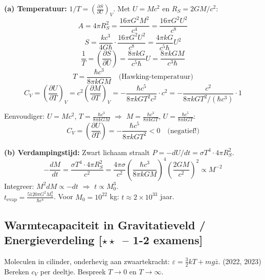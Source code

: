 \documentclass[10pt,a4paper]{article}
\newcommand{\pder}[2]{\left(\frac{\partial #1}{\partial #2}\right)}
\begin{document}
\begin{oplossing}
\textbf{(a) Temperatuur:} $1/T = \pder{S}{U}_V$. Met $U = Mc^2$ en $R_S = 2GM/c^2$:
$$A = 4\pi R_S^2 = \frac{16\pi G^2 M^2}{c^4} = \frac{16\pi G^2 U^2}{c^8}$$
$$S = \frac{kc^3}{4G\hbar}\cdot\frac{16\pi G^2 U^2}{c^8} = \frac{4\pi kG}{c^5\hbar}U^2$$
$$\frac{1}{T} = \pder{S}{U} = \frac{8\pi kG}{c^5\hbar}U = \frac{8\pi kGM}{c^3\hbar}$$
$$T = \frac{\hbar c^3}{8\pi kGM} \quad \text{(Hawking-temperatuur)}$$
$$C_V = \pder{U}{T}_V = c^2\pder{M}{T}_V = -\frac{\hbar c^5}{8\pi kG T^2 c^2} \cdot c^2 = -\frac{c^2}{8\pi kGT^2/(\hbar c^3)} \cdot 1$$

Eenvoudiger: $U = Mc^2$, $T = \frac{\hbar c^3}{8\pi kGM}$ $\Rightarrow$ $M = \frac{\hbar c^3}{8\pi kGT}$, $U = \frac{\hbar c^5}{8\pi kGT}$:
$$C_V = \pder{U}{T} = -\frac{\hbar c^5}{8\pi kG T^2} < 0 \quad \text{(negatief!)}$$

\textbf{(b) Verdampingstijd:} Zwart lichaam straalt $P = -dU/dt = \sigma T^4 \cdot 4\pi R_S^2$.
$$-\frac{dM}{dt} = \frac{\sigma T^4 \cdot 4\pi R_S^2}{c^2} = \frac{4\pi\sigma}{c^2}\left(\frac{\hbar c^3}{8\pi kGM}\right)^4\left(\frac{2GM}{c^2}\right)^2 \propto M^{-2}$$
Integreer: $M^2 dM \propto -dt$ $\Rightarrow$ $t \propto M_0^3$.\\
$t_\text{evap} = \frac{5120\pi G^2 M_0^3}{\hbar c^4}$. Voor $M_0 = 10^{22}$ kg: $t \approx 2\times10^{33}$ jaar.
\end{oplossing}

\subsection{Warmtecapaciteit in Gravitatieveld / Energieverdeling \textnormal{\color{warningred}[$\star\star$\ -- 1-2 examens]}}

\begin{oefening}{Moleculen in cilinder, onderhevig aan zwaartekracht: $\varepsilon = \frac{3}{2}kT + mg\bar{z}$. \textnormal{(2022, 2023)}}
Bereken $c_V$ per deeltje. Bespreek $T\to0$ en $T\to\infty$.
\end{oefening}
\end{document}
